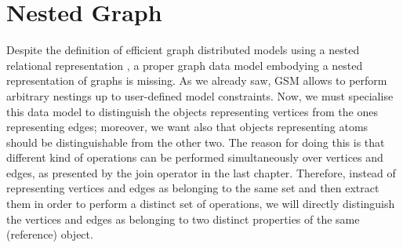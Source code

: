 \section{Nested Graph}\label{def:ngraph}
Despite the definition of efficient graph distributed models using a nested relational representation \cite{Labouseur2015}, a proper graph data model embodying a nested representation of graphs is missing. As we already saw, GSM allows to perform arbitrary nestings up to user-defined model constraints. Now, we must specialise this data model to distinguish the objects representing vertices from the ones representing edges; moreover, we want also that objects representing atoms should be distinguishable from the other two. The reason for doing this is that different kind of operations can be performed simultaneously over vertices and edges, as presented by the join operator in the last chapter. Therefore, instead of representing vertices and edges as belonging to the same set and then extract them in order to perform a distinct set of operations, we will directly distinguish the vertices and edges as belonging to two distinct properties of the same (reference) object.

